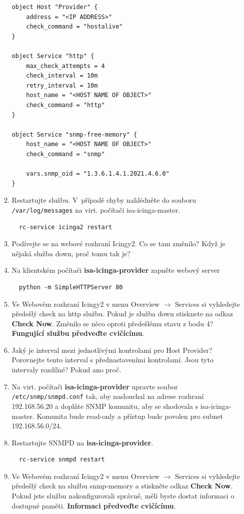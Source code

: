 \begin{itemize}
\begin{enumerate}
\begin{verbatim}
object Host "Provider" {
    address = "<IP ADDRESS>"
    check_command = "hostalive"
}

object Service "http" {
    max_check_attempts = 4
    check_interval = 10m
    retry_interval = 10m
    host_name = "<HOST NAME OF OBJECT>"
    check_command = "http"
}

object Service "snmp-free-memory" {
    host_name = "<HOST NAME OF OBJECT>"
    check_command = "snmp"
    
    vars.snmp_oid = "1.3.6.1.4.1.2021.4.6.0"
}

\end{verbatim} 
            \item Restartujte službu. V~případě chyby nahlédněte do souboru {\tt /var/log/messages} na virt. počítači isa-icinga-master.
\begin{verbatim}
  rc-service icinga2 restart
\end{verbatim} 
          \item Podívejte se na webové rozhraní Icingy2. Co se tam změnilo? 
          Když je nějaká služba down, proč tomu tak je?

          \item Na klientském počítači {\bf isa-icinga-provider} zapněte webový server
\begin{verbatim}
  python -m SimpleHTTPServer 80
\end{verbatim}
          \item Ve Webovém rozhraní Icingy2 v menu Overview $\rightarrow$ Services si vyhledejte předešlý check na http službu. Pokud je služba down stisknete na odkaz {\bf Check Now}. Změnilo se něco oproti předešlému stavu z bodu 4? {\bf Fungující službu předveďte cvičícímu}.

          \item Jaký je interval mezi jednotlivými kontrolami pro Host Provider? Porovnejte tento interval s přednastaveními kontrolami. Jsou tyto intervaly rozdílné? Pokud ano proč.

          \item Na virt. počítači {\bf isa-icinga-provider} upravte soubor {\tt /etc/snmp/snmpd.conf} tak, aby naslouchal na adrese rozhraní 192.168.56.20 a doplňte SNMP komunitu, aby se shodovala s isa-icinga-master. Komunita bude read-only
          a přístup bude povolen pro subnet 192.168.56.0/24.
          
          \item Restartujte SNMPD na {\bf isa-icinga-provider}.
\begin{verbatim}
  rc-service snmpd restart
\end{verbatim}
          \item Ve Webovém rozhraní Icingy2 v menu Overview $\rightarrow$ Services si vyhledejte předešlý check na službu snmp-memory a stiskněte odkaz {\bf Check Now}. Pokud jste službu nakonfigurovali správně, měli byste dostat informaci o dostupné paměti. {\bf Informaci předveďte cvičícímu}.
          
\end{enumerate}
\end{itemize}

